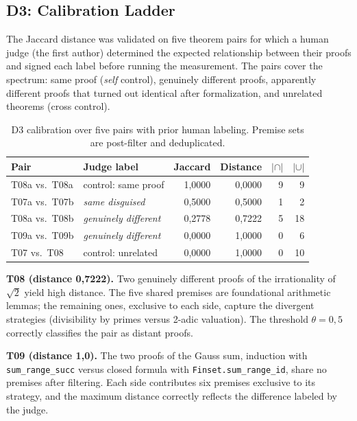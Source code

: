 \documentclass[12pt,a4paper]{article}
\theoremstyle{remark}
\begin{document}
\subsection{D3: Calibration Ladder}
\label{ssec:d3cal}

The Jaccard distance was validated on five theorem pairs for which a human judge (the first author) determined the expected relationship between their proofs and signed each label before running the measurement. The pairs cover the spectrum: same proof (\textit{self} control), genuinely different proofs, apparently different proofs that turned out identical after formalization, and unrelated theorems (cross control).

\begin{table}[htbp]
\centering
\small
\setlength{\tabcolsep}{5pt}
\begin{tabular}{llrrrr}
\toprule
Pair & Judge label & Jaccard & Distance & $|\cap|$ & $|\cup|$ \\
\midrule
T08a vs.\ T08a & control: same proof      & 1{,}0000 & 0{,}0000 & 9 & 9 \\
T07a vs.\ T07b & \textit{same disguised}    & 0{,}5000 & 0{,}5000 & 1 & 2 \\
T08a vs.\ T08b & \textit{genuinely different} & 0{,}2778 & 0{,}7222 & 5 & 18 \\
T09a vs.\ T09b & \textit{genuinely different} & 0{,}0000 & 1{,}0000 & 0 & 6 \\
T07 vs.\ T08   & control: unrelated   & 0{,}0000 & 1{,}0000 & 0 & 10 \\
\bottomrule
\end{tabular}
\caption{D3 calibration over five pairs with prior human labeling. Premise sets are post-filter and deduplicated.}
\label{tab:d3cal}
\end{table}

\textbf{T08 (distance 0{,}7222).} Two genuinely different proofs of the irrationality of $\sqrt{2}$ yield high distance. The five shared premises are foundational arithmetic lemmas; the remaining ones, exclusive to each side, capture the divergent strategies (divisibility by primes versus 2-adic valuation). The threshold $\theta = 0{,}5$ correctly classifies the pair as distant proofs.

\textbf{T09 (distance 1{,}0).} The two proofs of the Gauss sum, induction with \texttt{sum\_range\_succ} versus closed formula with \texttt{Finset.sum\_range\_id}, share no premises after filtering. Each side contributes six premises exclusive to its strategy, and the maximum distance correctly reflects the difference labeled by the judge.
\end{document}
